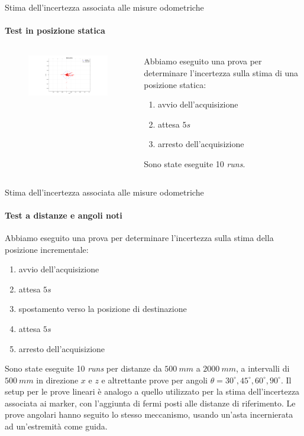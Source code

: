 \documentclass{beamer}
\begin{document}
\begin{frame}{Stima dell'incertezza associata alle misure odometriche}
\framesubtitle{Test in posizione statica}
\begin{columns}
    \begin{column}{0.6\textwidth}
    \begin{figure}
            \centering
            \includegraphics[width=10cm]{images/static.png}
            \label{fig:staticpos}
        \end{figure}
        
    \end{column}
    \begin{column}{0.4\textwidth}
        Abbiamo eseguito una prova per determinare l'incertezza sulla stima di una posizione statica:
        \begin{enumerate}
            \item avvio dell'acquisizione
            \item attesa $5s$
            \item arresto dell'acquisizione
        \end{enumerate}
        Sono state eseguite 10 \emph{runs}.
    \end{column}
\end{columns}
\end{frame}

\begin{frame}{Stima dell'incertezza associata alle misure odometriche}
\framesubtitle{Test a distanze e angoli noti}
Abbiamo eseguito una prova per determinare l'incertezza sulla stima della posizione incrementale:
        \begin{enumerate}
            \item avvio dell'acquisizione
            \item attesa $5s$
            \item spostamento verso la posizione di destinazione
            \item attesa $5s$
            \item arresto dell'acquisizione
        \end{enumerate}
        Sono state eseguite 10 \emph{runs} per distanze da $500\ mm$ a $2000\ mm$, a intervalli di $500\ mm$ in direzione $x$ e $z$ e altrettante prove per angoli $\theta=30^{\circ},45^{\circ},60^{\circ},90^{\circ}$.
        Il setup per le prove lineari è analogo a quello utilizzato per la stima dell'incertezza associata ai marker, con l'aggiunta di fermi posti alle distanze di riferimento. Le prove angolari hanno seguito lo stesso meccanismo, usando un'asta incernierata ad un'estremità come guida.
\end{frame}
\end{document}
